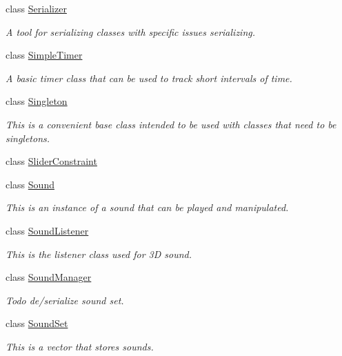 \begin{DoxyCompactItemize}
class \hyperlink{classphys_1_1Serializer}{Serializer}
\begin{DoxyCompactList}\small\item\em A tool for serializing classes with specific issues serializing. \item\end{DoxyCompactList}\item 
class \hyperlink{classphys_1_1SimpleTimer}{SimpleTimer}
\begin{DoxyCompactList}\small\item\em A basic timer class that can be used to track short intervals of time. \item\end{DoxyCompactList}\item 
class \hyperlink{classphys_1_1Singleton}{Singleton}
\begin{DoxyCompactList}\small\item\em This is a convenient base class intended to be used with classes that need to be singletons. \item\end{DoxyCompactList}\item 
class \hyperlink{classphys_1_1SliderConstraint}{SliderConstraint}
\item 
class \hyperlink{classphys_1_1Sound}{Sound}
\begin{DoxyCompactList}\small\item\em This is an instance of a sound that can be played and manipulated. \item\end{DoxyCompactList}\item 
class \hyperlink{classphys_1_1SoundListener}{SoundListener}
\begin{DoxyCompactList}\small\item\em This is the listener class used for 3D sound. \item\end{DoxyCompactList}\item 
class \hyperlink{classphys_1_1SoundManager}{SoundManager}
\begin{DoxyCompactList}\small\item\em Todo de/serialize sound set. \item\end{DoxyCompactList}\item 
class \hyperlink{classphys_1_1SoundSet}{SoundSet}
\begin{DoxyCompactList}\small\item\em This is a vector that stores sounds. \item\end{DoxyCompactList}\item 

\end{DoxyCompactItemize}
